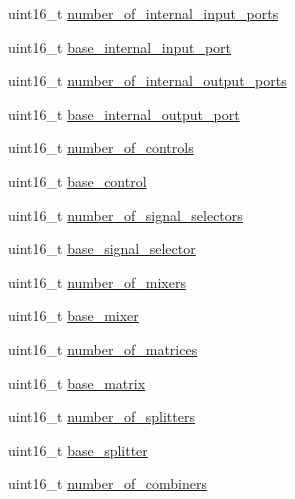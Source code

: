 \begin{DoxyCompactItemize}
\item 
uint16\+\_\+t \hyperlink{structjdksavdecc__descriptor__video__unit_af14e1056175671f086901f07420bf46f}{number\+\_\+of\+\_\+internal\+\_\+input\+\_\+ports}
\item 
uint16\+\_\+t \hyperlink{structjdksavdecc__descriptor__video__unit_a11d926248b31db1ff60e6416c9c3d996}{base\+\_\+internal\+\_\+input\+\_\+port}
\item 
uint16\+\_\+t \hyperlink{structjdksavdecc__descriptor__video__unit_aeba303ee329974d2a1c3ff9b5b41ed4b}{number\+\_\+of\+\_\+internal\+\_\+output\+\_\+ports}
\item 
uint16\+\_\+t \hyperlink{structjdksavdecc__descriptor__video__unit_a238f1b0f1c8556b5e9586d93541169a5}{base\+\_\+internal\+\_\+output\+\_\+port}
\item 
uint16\+\_\+t \hyperlink{structjdksavdecc__descriptor__video__unit_a0104bea638bdadf1a547c2b93813e22f}{number\+\_\+of\+\_\+controls}
\item 
uint16\+\_\+t \hyperlink{structjdksavdecc__descriptor__video__unit_af06eac7dd98377a85258308e8a25e7f2}{base\+\_\+control}
\item 
uint16\+\_\+t \hyperlink{structjdksavdecc__descriptor__video__unit_af062758f302e01b8b7b7bd84cdb15806}{number\+\_\+of\+\_\+signal\+\_\+selectors}
\item 
uint16\+\_\+t \hyperlink{structjdksavdecc__descriptor__video__unit_a5bd998af8a76ae1336006ec16829b64d}{base\+\_\+signal\+\_\+selector}
\item 
uint16\+\_\+t \hyperlink{structjdksavdecc__descriptor__video__unit_a6d06803f27b9635d1fb276aa4d4a070b}{number\+\_\+of\+\_\+mixers}
\item 
uint16\+\_\+t \hyperlink{structjdksavdecc__descriptor__video__unit_ad2cbeba461f7e25ffee9118ab1343ee0}{base\+\_\+mixer}
\item 
uint16\+\_\+t \hyperlink{structjdksavdecc__descriptor__video__unit_a0c19f1b0409a0cdaaf557f4a7a717260}{number\+\_\+of\+\_\+matrices}
\item 
uint16\+\_\+t \hyperlink{structjdksavdecc__descriptor__video__unit_a4faf17fd3b3d91f6b24fe8d66a042309}{base\+\_\+matrix}
\item 
uint16\+\_\+t \hyperlink{structjdksavdecc__descriptor__video__unit_a3b40548ad0ea8b330660dcee0de42db7}{number\+\_\+of\+\_\+splitters}
\item 
uint16\+\_\+t \hyperlink{structjdksavdecc__descriptor__video__unit_a7a10a93a209406b90273d791f69a4421}{base\+\_\+splitter}
\item 
uint16\+\_\+t \hyperlink{structjdksavdecc__descriptor__video__unit_afbc32f9432e80e58a019b1be2388cf66}{number\+\_\+of\+\_\+combiners}

\end{DoxyCompactItemize}
